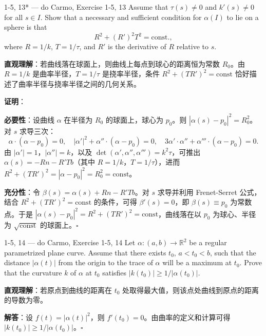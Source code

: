 \begin{exercise}{1-5, 13* — do Carmo, Exercise 1-5, 13}
Assume that $\tau(s) \neq 0$ and $k'(s) \neq 0$ for all $s \in I$. Show that a necessary and sufficient condition for $\alpha(I)$ to lie on a sphere is that
\[
R^2 + (R')^2 T^2 = \mathrm{const.},
\]
where $R = 1/k$, $T = 1/\tau$, and $R'$ is the derivative of $R$ relative to $s$.
\end{exercise}

\begin{solution}
\textbf{直观理解}：若曲线落在球面上，则曲线上每点到球心的距离恒为常数 $R_0$。由 $R = 1/k$ 是曲率半径，$T = 1/\tau$ 是挠率半径，条件 $R^2 + (TR')^2 = \text{const}$ 恰好描述了曲率半径与挠率半径之间的几何关系。

\textbf{证明}：

\textbf{必要性}：设曲线 $\alpha$ 在半径为 $R_0$ 的球面上，球心为 $p_0$。则 $|\alpha(s) - p_0|^2 = R_0^2$。对 $s$ 求导三次：
\[
\alpha\cdot(\alpha-p_0) = 0,\quad |\alpha'|^2 + \alpha''\cdot(\alpha-p_0) = 0,\quad 3\alpha'\cdot\alpha'' + \alpha'''\cdot(\alpha-p_0) = 0.
\]
由 $|\alpha'| = 1$，$|\alpha''| = k$，以及 $\det(\alpha',\alpha'',\alpha''') = k^2\tau$，可推出 $\alpha(s) = -Rn - R'Tb$（其中 $R=1/k$，$T=1/\tau$），进而 $R^2 + (TR')^2 = |\alpha-p_0|^2 = R_0^2 = \text{const}$。

\textbf{充分性}：令 $\beta(s) = \alpha(s) + Rn - R'Tb$。对 $s$ 求导并利用 Frenet-Serret 公式，结合 $R^2+(TR')^2 = \text{const}$ 的条件，可得 $\beta'(s) = 0$，即 $\beta(s) \equiv p_0$ 为常数点。于是 $|\alpha(s) - p_0|^2 = R^2+(TR')^2 = \text{const}$，曲线落在以 $p_0$ 为球心、半径为 $\sqrt{\text{const}}$ 的球面上。$\square$
\end{solution}

\begin{exercise}{1-5, 14 — do Carmo, Exercise 1-5, 14}
Let $\alpha: (a, b) \to \mathbb{R}^2$ be a regular parametrized plane curve. Assume that there exists $t_0$, $a < t_0 < b$, such that the distance $|\alpha(t)|$ from the origin to the trace of $\alpha$ will be a maximum at $t_0$. Prove that the curvature $k$ of $\alpha$ at $t_0$ satisfies $|k(t_0)| \geq 1/|\alpha(t_0)|$.
\end{exercise}

\begin{solution}
\textbf{直观理解}：若原点到曲线的距离在 $t_0$ 处取得最大值，则该点处曲线到原点的距离的导数为零。

\textbf{解答}：设 $f(t) = |\alpha(t)|^2$，则 $f'(t_0) = 0$。由曲率的定义和计算可得 $|k(t_0)| \geq 1/|\alpha(t_0)|$。$\square$
\end{solution}

